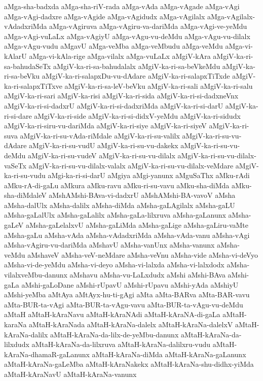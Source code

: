 {aMga-sha-badxda
aMga-sha-riV-rada
aMga-vAda
aMga-vAgade
aMga-vAgi
aMga-vAgi-dadxre
aMga-vAgide
aMga-vAgidudx
aMga-vAgilalx
aMga-vAgilalx-vAdadxriMda
aMga-vAgiruva
aMga-vAgiru-va-dariMda
aMga-vAgi-ve-yeMdu
aMga-vAgi-vuLaLx
aMga-vAgiyU
aMga-vAgu-vu-deMdu
aMga-vAgu-vu-dilalx
aMga-vAgu-vudu
aMgavU
aMga-veMba
aMga-veMbudu
aMga-veMdu
aMga-vi-kAlarU
aMga-vi-kAla-rige
aMga-vilalx
aMga-vuLaLx
aMgiV-kAra
aMgiV-ka-ri-sa-bahudaSeTx
aMgiV-ka-ri-sa-bahudalalx
aMgiV-ka-ri-sa-beVkeMdu
aMgiV-ka-ri-sa-beVku
aMgiV-ka-ri-salapxDu-vu-dAdare
aMgiV-ka-ri-salapxTiTxde
aMgiV-ka-ri-salapxTiTxve
aMgiV-ka-ri-sa-leV-beVku
aMgiV-ka-ri-sali
aMgiV-ka-ri-salu
aMgiV-ka-ri-sari
aMgiV-ka-risi
aMgiV-ka-ri-sida
aMgiV-ka-ri-si-dadxneVnx
aMgiV-ka-ri-si-dadxrU
aMgiV-ka-ri-si-dadxriMda
aMgiV-ka-ri-si-darU
aMgiV-ka-ri-si-dare
aMgiV-ka-ri-side
aMgiV-ka-ri-si-didxV-yeMdu
aMgiV-ka-ri-sidudx
aMgiV-ka-ri-siru-vu-dariMda
aMgiV-ka-ri-siye
aMgiV-ka-ri-siyeV
aMgiV-ka-ri-suva
aMgiV-ka-ri-su-vAda-riMdale
aMgiV-ka-ri-su-valilx
aMgiV-ka-ri-su-vu-dAdare
aMgiV-ka-ri-su-vudU
aMgiV-ka-ri-su-vu-dakekx
aMgiV-ka-ri-su-vu-deMdu
aMgiV-ka-ri-su-vudeV
aMgiV-ka-ri-su-vu-dilalx
aMgiV-ka-ri-su-vu-dilalx-vaSeTx
aMgiV-ka-ri-su-vu-dilalx-valalx
aMgiV-ka-ri-su-vu-dilalx-veMdare
aMgiV-ka-ri-su-vudu
aMgi-ka-ri-si-darU
aMgiya
aMgi-yanunx
aMguSaThx
aMku-rAdi
aMku-rA-di-gaLu
aMkura
aMku-ravu
aMku-ri-su-vavu
aMku-sha-diMda
aMku-sha-diMdaleV
aMshAMshi-BAva-vi-dadxrU
aMshAMshi-BA-vavoV
aMsha
aMsha-dalUlx
aMsha-dalilx
aMsha-diMda
aMsha-gaLAgilalx
aMsha-gaLU
aMsha-gaLalUlx
aMsha-gaLalilx
aMsha-gaLa-lilxruva
aMsha-gaLanunx
aMsha-gaLeV
aMsha-gaLelalxvU
aMsha-gaLiMda
aMsha-gaLige
aMsha-gaLiru-vaMte
aMsha-gaLu
aMsha-vAda
aMsha-vAdadxriMda
aMsha-vAda-vanu
aMsha-vAgi
aMsha-vAgiru-vu-dariMda
aMshavU
aMsha-vanUnx
aMsha-vanunx
aMsha-veMdu
aMshaveV
aMsha-veV-neMdare
aMsha-veVnu
aMsha-vide
aMsha-vi-deVyo
aMsha-vi-de-yeMdu
aMsha-vi-deyo
aMsha-vi-lalxda
aMsha-vi-lalxdodx
aMsha-vilalxveMbu-danunx
aMshavu
aMsha-vu-LaLxdudx
aMshi
aMshi-BAva
aMshi-gaLa
aMshi-gaLoDane
aMshi-rUpavU
aMshi-rUpavu
aMshi-yAda
aMshiyU
aMshi-yeMba
aMtAya
aMtAyx-hu-ti-gAgi
aMta
aMta-BARva
aMta-BAR-vavu
aMta-BUR-ta-vAgi
aMta-BUR-ta-vAgu-vavu
aMta-BUR-ta-vAgu-vu-deMdu
aMtaH
aMtaH-kAraNavu
aMtaH-kAraNAdi
aMtaH-kAraNA-di-gaLa
aMtaH-karaNa
aMtaH-kAraNada
aMtaH-kAraNa-dalelx
aMtaH-kAraNa-dalelxV
aMtaH-kAraNa-dalilx
aMtaH-kAraNa-da-lilx-de-yeMbu-danunx
aMtaH-kAraNa-da-lilxdudx
aMtaH-kAraNa-da-lilxruva
aMtaH-kAraNa-dalilxru-vudu
aMtaH-kAraNa-dhamaR-gaLanunx
aMtaH-kAraNa-diMda
aMtaH-kAraNa-gaLanunx
aMtaH-kAraNa-gaLeMba
aMtaH-kAraNakekx
aMtaH-kAraNa-shu-didhx-yiMda
aMtaH-kAraNavU
aMtaH-kAraNa-vanunx
}
